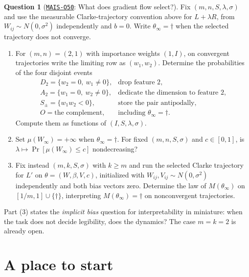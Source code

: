 \documentclass[11pt]{amsart}
\newcommand{\Oid}[1]{\href{https://github.com/lionellevine/MAIS/blob/main/open-problems/MAIS-O#1.md}{\texttt{MAIS-O#1}}}
\theoremstyle{plain}
\theoremstyle{definition}
\newtheorem{question}[theorem]{Question}
\begin{document}
\begin{question}[\Oid{50}: What does gradient flow select?]\label{q:dynamics}
Fix $(m,n,S,\lambda,\sigma)$ and use the measurable Clarke-trajectory convention above for $L+\lambda R$, from $W_{ij}\sim N(0,\sigma^2)$ independently and $b=0$. Write $\theta_\infty=\dagger$ when the selected trajectory does not converge.
\begin{enumerate}
\item For $(m,n)=(2,1)$ with importance weights $(1,I)$, on convergent trajectories write the limiting row as $(w_1,w_2)$. Determine the probabilities of the four disjoint events
\[
\begin{array}{ll}
D_2=\{w_2=0,\ w_1\ne0\}, & \text{drop feature 2},\\
A_2=\{w_1=0,\ w_2\ne0\}, & \text{dedicate the dimension to feature 2},\\
S_{\pm}=\{w_1w_2<0\}, & \text{store the pair antipodally},\\
O=\text{the complement}, & \text{including }\theta_\infty=\dagger.
\end{array}
\]
Compute them as functions of $(I,S,\lambda,\sigma)$.
\item Set $\mu(W_\infty)=+\infty$ when $\theta_\infty=\dagger$. For fixed $(m,n,S,\sigma)$ and $c\in[0,1]$, is $\lambda\mapsto \Pr[\mu(W_\infty)\le c]$ nondecreasing?
\item Fix instead $(m,k,S,\sigma)$ with $k\ge m$ and run the selected Clarke trajectory for $L'$ on $\theta=(W,\beta,V,c)$, initialized with $W_{ij},V_{ij}\sim N(0,\sigma^2)$ independently and both bias vectors zero. Determine the law of $M(\theta_\infty)$ on $[1/m,1]\cup\{\dagger\}$, interpreting $M(\theta_\infty)=\dagger$ on nonconvergent trajectories.
\end{enumerate}
\end{question}

Part (3) states the \emph{implicit bias} question for interpretability in miniature: when the task does not decide legibility, does the dynamics? The case $m=k=2$ is already open.

\section{A place to start}\label{sec:start}
\end{document}
